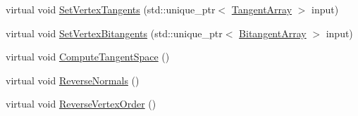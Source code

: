 \begin{DoxyCompactItemize}
virtual void \hyperlink{class_rendering_object_a041c99c6f0d570bb7c36b9d2168f0b0d}{Set\+Vertex\+Tangents} (std\+::unique\+\_\+ptr$<$ \hyperlink{class_rendering_object_a45b53e911c2f0131aa10e89869d38944}{Tangent\+Array} $>$ input)
\item
virtual void \hyperlink{class_rendering_object_a095317dd60a7558c22409e2fabcb252e}{Set\+Vertex\+Bitangents} (std\+::unique\+\_\+ptr$<$ \hyperlink{class_rendering_object_a6c6bf305a5f0f9ce1006f374c753c856}{Bitangent\+Array} $>$ input)
\item
virtual void \hyperlink{class_rendering_object_adec25796def807fd09a5fc4f1fbd0c41}{Compute\+Tangent\+Space} ()
\item
virtual void \hyperlink{class_rendering_object_a761ad8574fc4424e12487512bb30067c}{Reverse\+Normals} ()
\item
virtual void \hyperlink{class_rendering_object_a2f175770ceadac2fea979f191974665b}{Reverse\+Vertex\+Order} ()
\end{DoxyCompactItemize}
